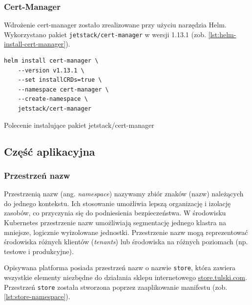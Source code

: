 \subsubsection{Cert-Manager}\label{subsubsec:cert-manager-impl}

Wdrożenie cert-manager zostało zrealizowane przy użyciu narzędzia Helm.
Wykorzystano pakiet \texttt{jetstack/cert-manager} w wersji 1.13.1 (zob. \autoref{lst:helm-install-cert-manager}).

\begin{listing}[H]
    \begin{verbatim}
helm install cert-manager \
    --version v1.13.1 \
    --set installCRDs=true \
    --namespace cert-manager \
    --create-namespace \
    jetstack/cert-manager
    \end{verbatim}
    \caption{Polecenie instalujące pakiet jetstack/cert-manager}
    \label{lst:helm-install-cert-manager}
\end{listing}

%

\newpage

\subsection{Część aplikacyjna}\label{subsec:store}

\subsubsection{Przestrzeń nazw}

Przestrzenią nazw (ang. \emph{namespace}) nazywamy zbiór znaków (nazw) należących do jednego kontekstu.
Ich stosowanie umożliwia lepszą organizację i izolację zasobów, co przyczynia się do podniesienia bezpieczeństwa.
W środowisku Kubernetes przestrzenie nazw umożliwiają segmentację jednego klastra na mniejsze, logicznie wyizolowane jednostki.
Przestrzenie nazw mogą reprezentować środowiska różnych klientów (\emph{tenants}) lub środowiska na różnych poziomach (np. testowe i produkcyjne).

Opisywana platforma posiada przestrzeń nazw o nazwie \texttt{store}, która zawiera wszystkie elementy niezbędne do działania sklepu internetowego \url{store.tulski.com}.
Przestrzeń \texttt{store} została stworzona poprzez zaaplikowanie manifestu (zob. \autoref{lst:store-namespace}).

